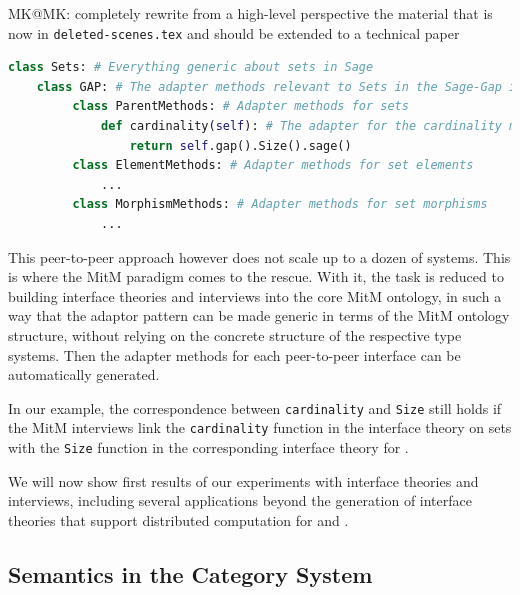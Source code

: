 \begin{newpart}{MK@MK: completely rewrite from a high-level perspective the material that
    is now in \texttt{deleted-scenes.tex} and should be extended to a technical paper}
\begin{lstlisting}[language=Python,label=lst:adaptor,
  caption=A Semantic Adaptor Method in \Sage]
class Sets: # Everything generic about sets in Sage
    class GAP: # The adapter methods relevant to Sets in the Sage-Gap interface
         class ParentMethods: # Adapter methods for sets
             def cardinality(self): # The adapter for the cardinality method
                 return self.gap().Size().sage()
         class ElementMethods: # Adapter methods for set elements
             ...
         class MorphismMethods: # Adapter methods for set morphisms
             ...
\end{lstlisting}

This peer-to-peer approach however does not scale up to a dozen of
systems. This is where the MitM paradigm comes to the rescue. With it,
the task is reduced to building interface theories and interviews into
the core MitM ontology, in such a way that the adaptor pattern can be
made generic in terms of the MitM ontology structure, without relying
on the concrete structure of the respective type systems. Then the
adapter methods for each peer-to-peer interface can be automatically
generated.

In our example, the correspondence between \texttt{cardinality} and
\texttt{Size} still holds if the MitM interviews link the
\texttt{cardinality} function in the \Sage interface theory on sets
with the \texttt{Size} function in the corresponding interface theory
for \GAP.

We will now show first results of our experiments with interface
theories and interviews, including several applications beyond the
generation of interface theories that support distributed computation
for \Sage and \GAP.
\end{newpart}

\subsection{Semantics in the \Sage Category System}

